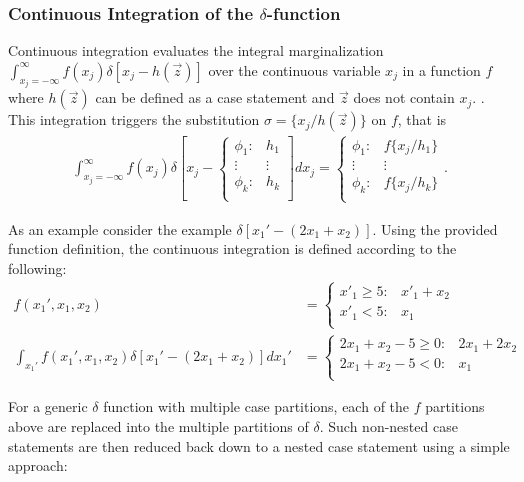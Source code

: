 \documentclass[twoside,11pt]{article}
\begin{document}
\subsubsection*{Continuous Integration of the $\delta$-function}
Continuous integration evaluates the integral marginalization $\int_{x_j= - \infty}^{\infty} f(x_j)\delta[x_j - h(\vec{z})]$ over the continuous variable $x_j$ in a function $f$  where $h(\vec{z})$ can be defined as a case statement and $\vec{z}$ does not contain $x_j$. . 
This integration triggers the substitution $\sigma = \{ x_j / h(\vec{z}) \}$ on $f$, that is
\begin{align}
\int_{x_j =-\infty}^{\infty} f(x_j)
\delta\left[ x_j - \begin{cases}
    \phi_1: & h_1 \\ 
   \vdots&\vdots\\ 
    \phi_k: & h_k \\ 
  \end{cases} \right] dx_j =%
  \begin{cases}
    \phi_1: & f \{ x_j / h_1 \} \\ 
   \vdots&\vdots\\ 
    \phi_k: & f \{ x_j/ h_k \}  \\ 
  \end{cases}. \label{eq:gen_int}
\end{align}

As an example consider the example $\delta\left[ x_1' - (2x_1 + x_2) \right]$. Using the provided function definition, the continuous integration is defined according to the following: 
\begin{align*}
f (x_1',x_1,x_2)&= \begin{cases}
    x'_1 \geq 5 : & x'_1 + x_2 \\ 
    x'_1 < 5: & x_1 \\ 
  \end{cases} 
 \\
 \int_{x_1'} f(x_1',x_1,x_2)\delta\left[ x_1'- (2x_1+x_2) \right] dx_1'&= \begin{cases}
   2x_1 + x_2 - 5 \geq 0 : & 2x_1 + 2x_2 \\ 
    2x_1 + x_2 -5  < 0 : & x_1 \\
  \end{cases}
  \end{align*}
 
For a generic $\delta$ function with multiple case partitions, each of the $f$ partitions above are replaced into the multiple partitions of $\delta$. Such non-nested case statements are then reduced back down to a nested case
statement using a simple approach:
\end{document}
